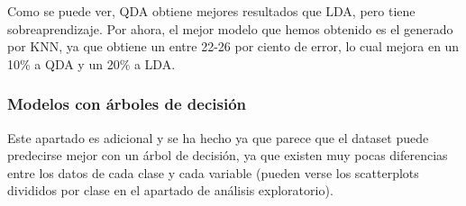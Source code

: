 \documentclass[11pt]{article}
\begin{document}
    Como se puede ver, QDA obtiene mejores resultados que LDA, pero tiene
sobreaprendizaje. Por ahora, el mejor modelo que hemos obtenido es el
generado por KNN, ya que obtiene un entre 22-26 por ciento de error, lo
cual mejora en un 10\% a QDA y un 20\% a LDA.

    \hypertarget{modelos-con-uxe1rboles-de-decisiuxf3n}{%
\subsubsection{Modelos con árboles de
decisión}\label{modelos-con-uxe1rboles-de-decisiuxf3n}}

Este apartado es adicional y se ha hecho ya que parece que el dataset
puede predecirse mejor con un árbol de decisión, ya que existen muy
pocas diferencias entre los datos de cada clase y cada variable (pueden
verse los scatterplots divididos por clase en el apartado de análisis
exploratorio).
\end{document}
